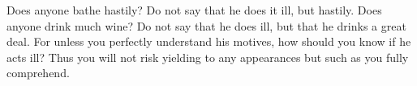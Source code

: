 Does anyone bathe  hastily? Do not say  that he does it ill,  but hastily. Does
anyone drink much wine? Do not say that he does ill, but that he drinks a great
deal. For unless  you perfectly understand his motives, how  should you know if
he acts ill? Thus you will not risk yielding to any appearances but such as you
fully comprehend.
